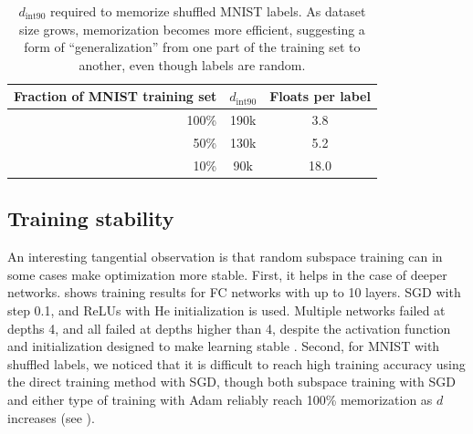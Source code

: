 \documentclass{article} %
\newcommand{\dintn}{d_{\mathrm{int90}}}
\begin{document}
\begin{table}[t]
\caption{$\dintn$ required to memorize shuffled MNIST labels. As dataset size grows, memorization becomes more efficient, suggesting a form of ``generalization'' from one part of the training set to another, even though labels are random.}
\begin{center}
\begin{tabular}{|r|c|c|}
  \hline
Fraction of MNIST training set & $\dintn$            & Floats per label \\
\hline
100\%    & 190k                & 3.8 \\
50\%     & 130k                & 5.2 \\
10\%     & 90k                 & 18.0 \\
\hline
\end{tabular}
\end{center}
\vspace*{-.7em}
\end{table}




%
\subsection{Training stability}

An interesting tangential observation is that random subspace training can in some cases make optimization more stable. First, it helps in the case of deeper networks.  shows training results for FC networks with up to 10 layers. SGD with step 0.1,  and ReLUs with He initialization is used.
Multiple networks failed at depths 4, and all failed at depths higher than 4, 
despite the activation function and initialization designed to make learning stable \citep{he2015delving}. Second, for MNIST with shuffled labels, we noticed that
it is difficult to reach high training accuracy using the direct training method with SGD, though both
subspace training with SGD and either type of training with Adam reliably reach 100\% memorization as $d$ increases (see ).
\end{document}

